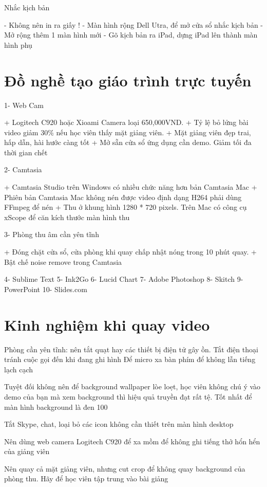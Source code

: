 Nhắc kịch bản

- Không nên in ra giấy !
- Màn hình rộng Dell Utra, để mở cửa sổ nhắc kịch bản
- Mở rộng thêm 1 màn hình mới
- Gõ kịch bản ra iPad, dựng iPad lên thành màn hình phụ

\section{Đồ nghề tạo giáo trình trực tuyến}

1- Web Cam

+ Logitech C920 hoặc Xioami Camera loại 650,000VND.
+ Tỷ lệ bỏ lửng bài video giảm 30\% nếu học viên thấy mặt giảng viên.
+ Mặt giảng viên đẹp trai, hấp dẫn, hài hước càng tốt
+ Mở sẵn cửa sổ ứng dụng cần demo. Giảm tối đa thời gian chết

2- Camtasia

+ Camtasia Studio trên Windows có nhiều chức năng hơn bản Camtasia Mac
+ Phiên bản Camtasia Mac không nén được video định dạng H264 phải dùng FFmpeg để nén
+ Thu ở khung hình 1280 * 720 pixels. Trên Mac có công cụ xScope để căn kích thước màn hình thu

3- Phòng thu âm cần yên tĩnh

+ Đóng chặt cửa sổ, cửa phòng khi quay chấp nhật nóng trong 10 phút quay.
+ Bật chế noise remove trong Camtasia

4- Sublime Text
5- Ink2Go
6- Lucid Chart
7- Adobe Photoshop
8- Skitch
9- PowerPoint
10- Slides.com

\section{Kinh nghiệm khi quay video}

Phòng cần yên tĩnh: nên tắt quạt hay các thiết bị điện tử gây ồn. Tắt điện thoại tránh cuộc gọi đến khi đang ghi hình
Để micro xa bàn phím để không lẫn tiếng lạch cạch

Tuyệt đối không nên để background wallpaper lòe loẹt, học viên không chú ý vào demo của bạn mà xem background thì hiệu quả truyền đạt rất tệ. Tốt nhất để màn hình background là đen 100%

Tắt Skype, chat, loại bỏ các icon không cần thiết trên màn hình desktop

Nên dùng web camera Logitech C920 để xa mồm để không ghi tiếng thở hổn hển của giảng viên

Nên quay cả mặt giảng viên, nhưng cut crop để không quay background của phòng thu. Hãy để học viên tập trung vào bài giảng

